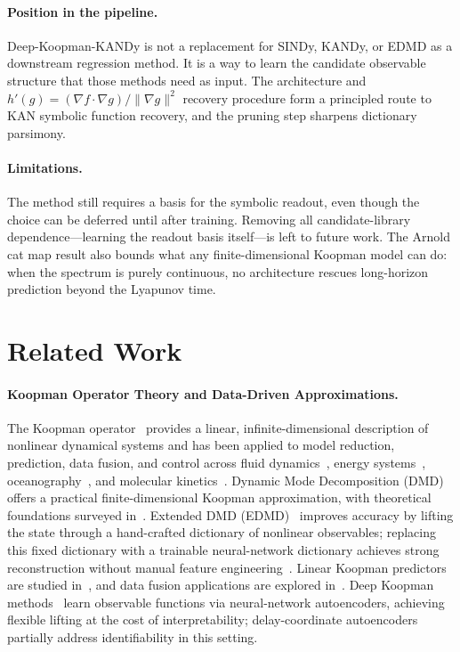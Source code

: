 \documentclass{article}
\begin{document}
\paragraph{Position in the pipeline.}
Deep-Koopman-KANDy is not a replacement for SINDy, KANDy, or EDMD as a
downstream regression method. It is a way to learn the candidate observable
structure that those methods need as input. The architecture and
$h'(g) = (\nabla f\cdot\nabla g)/\|\nabla g\|^2$ recovery procedure form a
principled route to KAN symbolic function recovery, and the pruning step
sharpens dictionary parsimony.

\paragraph{Limitations.}
The method still requires a basis for the symbolic readout, even though the choice can be deferred until after training. Removing all candidate-library dependence---learning the readout basis itself---is left to future work. The Arnold cat map result also bounds what any finite-dimensional Koopman model can do: when the spectrum is purely continuous, no architecture rescues long-horizon prediction beyond the Lyapunov time.




\appendix
\section{Related Work}

\paragraph{Koopman Operator Theory and Data-Driven Approximations.} The Koopman operator~\cite{koopman1931, koopman1932} provides a linear, infinite-dimensional description of nonlinear dynamical systems and has been applied to model reduction, prediction, data fusion, and control across fluid dynamics~\cite{mezic2013fluids, sharma2016correspondence, rowley2009spectral}, energy systems~\cite{georgescu2015building}, oceanography~\cite{giannakis2015spatiotemporal}, and molecular kinetics~\cite{wu2017variational}. Dynamic Mode Decomposition (DMD)~\cite{schmid2010dynamic} offers a practical finite-dimensional Koopman approximation, with theoretical foundations surveyed in~\cite{brunton2022modern, budisic2012applied}. Extended DMD (EDMD)~\cite{Williams2014} improves accuracy by lifting the state through a hand-crafted dictionary of nonlinear observables; replacing this fixed dictionary with a trainable neural-network dictionary achieves strong reconstruction without manual feature engineering~\cite{MoradiBollt2026}. Linear Koopman predictors are studied in~\cite{korda2017linearpredictors}, and data fusion applications are explored in~\cite{williams2015datafusion, brunton2016koopman}. Deep Koopman methods~\cite{lusch2018, li2017, otto2019} learn observable functions via neural-network autoencoders, achieving flexible lifting at the cost of interpretability; delay-coordinate autoencoders~\cite{Bakarji2023DelayAutoencoders} partially address identifiability in this setting.
\end{document}
